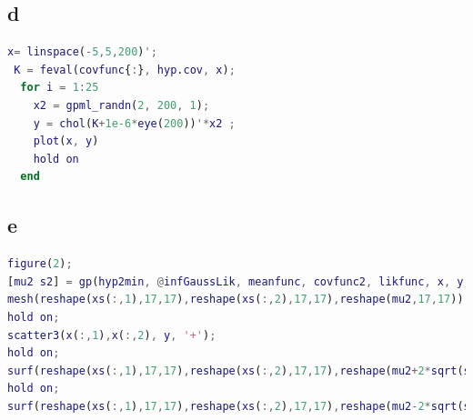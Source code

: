 \documentclass[twoside,twocolumn]{article}
\begin{document}
\subsection{d}
\begin{lstlisting}[language=matlab]
 x= linspace(-5,5,200)';
 K = feval(covfunc{:}, hyp.cov, x);
  for i = 1:25
    x2 = gpml_randn(2, 200, 1);
    y = chol(K+1e-6*eye(200))'*x2 ;
    plot(x, y)
    hold on
  end
\end{lstlisting}
\subsection{e}
\begin{lstlisting}[language=matlab]
%3D plotting
figure(2);
[mu2 s2] = gp(hyp2min, @infGaussLik, meanfunc, covfunc2, likfunc, x, y, xs);
mesh(reshape(xs(:,1),17,17),reshape(xs(:,2),17,17),reshape(mu2,17,17));
hold on;
scatter3(x(:,1),x(:,2), y, '+');
hold on;
surf(reshape(xs(:,1),17,17),reshape(xs(:,2),17,17),reshape(mu2+2*sqrt(s2),17,17),'FaceAlpha','0.1','EdgeColor' , 'none','FaceColor','k');
hold on;
surf(reshape(xs(:,1),17,17),reshape(xs(:,2),17,17),reshape(mu2-2*sqrt(s2),17,17),'FaceAlpha','0.1','EdgeColor' ,'none','FaceColor','k');
\end{lstlisting}

\end{document}
